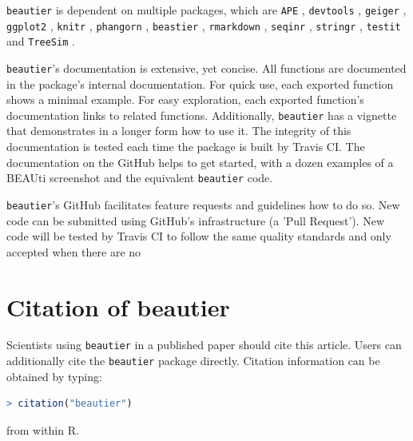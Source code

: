 \documentclass{article}
\begin{document}
\verb;beautier; is dependent on multiple packages, which are 
\verb;APE; \cite{APE}, 
\verb;devtools; \cite{devtools},
\verb;geiger; \cite{GEIGER},
\verb;ggplot2; \cite{ggplot2},
\verb;knitr; \cite{knitr},
\verb;phangorn; \cite{phangorn},
\verb;beastier; \cite{beastier},
\verb;rmarkdown; \cite{rmarkdown},
\verb;seqinr; \cite{seqinr},
\verb;stringr; \cite{stringr},
\verb;testit; \cite{testit} and 
\verb;TreeSim; \cite{TreeSim}.

\verb;beautier;'s documentation is extensive, yet concise. All functions are documented
in the package's internal documentation. For quick use, each exported function shows a minimal example. 
For easy exploration, each exported function's documentation links to related functions.
Additionally, \verb;beautier; has a vignette that demonstrates in a longer form how
to use it. The integrity of this documentation is tested each time the package is built by Travis CI.
The documentation on the GitHub helps to get started, with a dozen examples 
of a BEAUti screenshot and the equivalent \verb;beautier; code.

\verb;beautier;'s GitHub facilitates feature requests and guidelines how to do so.
New code can be submitted using GitHub's infrastructure (a 'Pull Request'). New
code will be tested by Travis CI to follow the same quality standards and only accepted
when there are no 


\section{Citation of beautier}

Scientists using \verb;beautier; in a published paper should cite this
article. Users can additionally cite the \verb;beautier; package 
directly. Citation information can be obtained by typing:

\begin{lstlisting}[language=R]
> citation("beautier")
\end{lstlisting}

from within R.




\begin{thebibliography}{}

\end{thebibliography}
\end{document}
